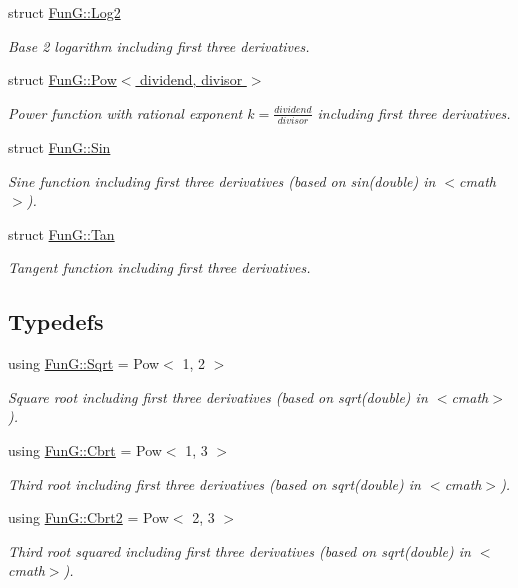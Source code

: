 \begin{DoxyCompactItemize}
struct \hyperlink{structFunG_1_1Log2}{Fun\+G\+::\+Log2}
\begin{DoxyCompactList}\small\item\em Base 2 logarithm including first three derivatives. \end{DoxyCompactList}\item 
struct \hyperlink{structFunG_1_1Pow}{Fun\+G\+::\+Pow$<$ dividend, divisor $>$}
\begin{DoxyCompactList}\small\item\em Power function with rational exponent $ k = \frac{dividend}{divisor} $ including first three derivatives. \end{DoxyCompactList}\item 
struct \hyperlink{structFunG_1_1Sin}{Fun\+G\+::\+Sin}
\begin{DoxyCompactList}\small\item\em Sine function including first three derivatives (based on sin(double) in $<$cmath$>$). \end{DoxyCompactList}\item 
struct \hyperlink{structFunG_1_1Tan}{Fun\+G\+::\+Tan}
\begin{DoxyCompactList}\small\item\em Tangent function including first three derivatives. \end{DoxyCompactList}\end{DoxyCompactItemize}
\subsection*{Typedefs}
\begin{DoxyCompactItemize}
\item 
using \hyperlink{group__CMathGroup_gaca80e773d5886f47cd49dc19b130263f}{Fun\+G\+::\+Sqrt} = Pow$<$ 1, 2 $>$
\begin{DoxyCompactList}\small\item\em Square root including first three derivatives (based on sqrt(double) in $<$cmath$>$). \end{DoxyCompactList}\item 
using \hyperlink{group__CMathGroup_ga2e4363ad8400e1c8431c10de2152ec2b}{Fun\+G\+::\+Cbrt} = Pow$<$ 1, 3 $>$
\begin{DoxyCompactList}\small\item\em Third root including first three derivatives (based on sqrt(double) in $<$cmath$>$). \end{DoxyCompactList}\item 
using \hyperlink{group__CMathGroup_ga9bcbef859d7ffd0d6570d69e1bd8503a}{Fun\+G\+::\+Cbrt2} = Pow$<$ 2, 3 $>$
\begin{DoxyCompactList}\small\item\em Third root squared including first three derivatives (based on sqrt(double) in $<$cmath$>$). \end{DoxyCompactList}\end{DoxyCompactItemize}
